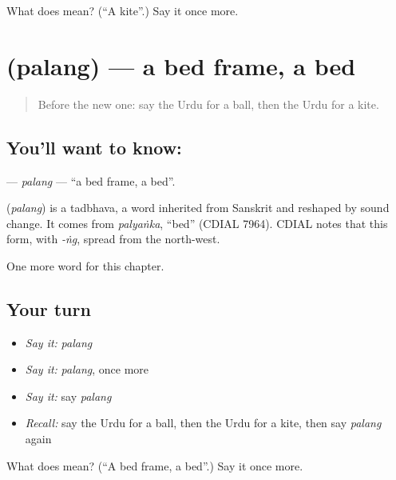 \begin{tcolorbox}[breakable,colback=teal!4,colframe=teal!35!black,title={Before you move on}]
What does  mean? (\textquotedblleft{}A kite\textquotedblright{}.) Say it once more.
\end{tcolorbox}
\section[\texorpdfstring{\ur{پلنگ} (palang)}{پلنگ (palang)}]{ (palang) — a bed frame, a bed}

\label{lesson:UR-C112-palang}



\begin{quote}
Before the new one: say the Urdu for a ball, then the Urdu for a kite.
\end{quote}

\subsection*{You'll want to know: }
\textbf{} — \emph{palang} — \textquotedblleft{}a bed frame, a bed\textquotedblright{}.

\begin{cousinweb}
\textbf{} (\emph{palang}) is a tadbhava, a word inherited from Sanskrit and reshaped by sound change. It comes from \emph{palyaṅka}, \textquotedblleft{}bed\textquotedblright{} (CDIAL 7964). CDIAL notes that this form, with \emph{-ṅg}, spread from the north-west.
\end{cousinweb}

\begin{grammarlens}[title={What you've built}]
One more word for this chapter.
\end{grammarlens}

\subsection*{Your turn}
\begin{itemize}
\raggedright
  \item \emph{Say it:} \emph{palang}
  \item \emph{Say it:} \emph{palang}, once more
  \item \emph{Say it:} say \emph{palang}
  \item \emph{Recall:} say the Urdu for a ball, then the Urdu for a kite, then say \emph{palang} again
\end{itemize}

\begin{tcolorbox}[breakable,colback=teal!4,colframe=teal!35!black,title={Before you move on}]
What does  mean? (\textquotedblleft{}A bed frame, a bed\textquotedblright{}.) Say it once more.
\end{tcolorbox}
